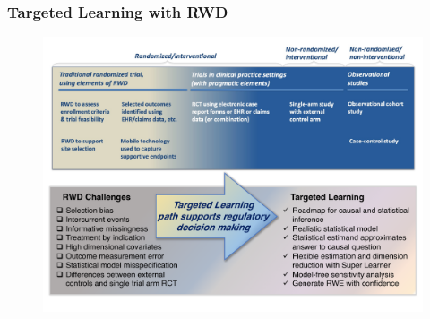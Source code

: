 \documentclass[t]{beamer}
\begin{document}
\begin{frame}
\frametitle{Targeted Learning with RWD}
\vspace{-18pt}
\centering
\begin{figure}
\begin{center}
\includegraphics[width=1.02\textwidth]{figures/TLpath2_edit.pdf}
\end{center}
\end{figure}
\vspace{35pt}
\end{frame}






\end{document}

